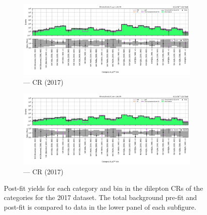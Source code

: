 \begin{figure}[htbp]
    \centering
    \begin{subfigure}[b]{0.9\textwidth}
        \includegraphics[width=\textwidth]{chapters/higgstoinv/figures/mountain_ranges/2017/ttH/Zmumu_tree_fit_b-abs_values_ttH_cats.pdf}
        \caption{\ttH --- \doubleMuCr \gls{CR} (2017)}
    \end{subfigure}
    \hfill
    \begin{subfigure}[b]{0.9\textwidth}
        \includegraphics[width=\textwidth]{chapters/higgstoinv/figures/mountain_ranges/2017/ttH/Zee_tree_fit_b-abs_values_ttH_cats.pdf}
        \caption{\ttH --- \doubleEleCr \gls{CR} (2017)}
    \end{subfigure}
    \caption[Post-fit yields for each category and \ptmiss bin in the dilepton control regions of the \ttH categories for the 2017 dataset]{Post-fit yields for each category and \ptmiss bin in the dilepton \glspl{CR} of the \ttH categories for the 2017 dataset. The total background pre-fit and post-fit is compared to data in the lower panel of each subfigure.}
    \label{fig:htoinv_mountain_range_2017_dilep_CRs_ttH}
\end{figure}

